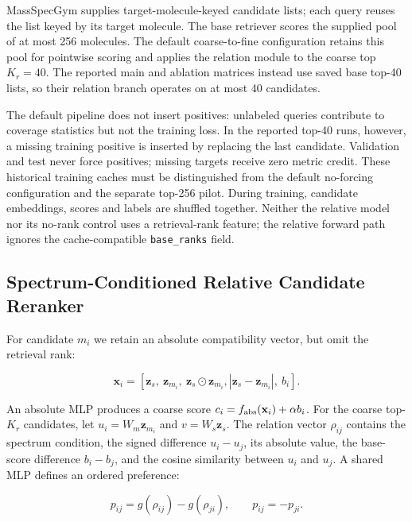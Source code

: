 \documentclass[runningheads]{llncs}
\newcommand{\zs}{\mathbf{z}_s}
\begin{document}
MassSpecGym supplies target-molecule-keyed candidate lists; each query reuses the
list keyed by its target molecule. The base retriever scores the supplied pool
of at most 256 molecules. The default coarse-to-fine configuration retains this
pool for pointwise scoring and applies the relation module to the coarse top
$K_r=40$. The reported main and ablation matrices instead use saved base top-40
lists, so their relation branch operates on at most 40 candidates.

The default pipeline does not insert positives: unlabeled queries contribute
to coverage statistics but not the training loss. In the reported top-40 runs,
however, a missing training positive is inserted by replacing the last
candidate. Validation and test never force positives; missing targets receive
zero metric credit. These historical training caches must be distinguished
from the default no-forcing configuration and the separate top-256 pilot.
During training, candidate embeddings, scores and labels are shuffled together.
Neither the relative model nor its no-rank control uses a retrieval-rank
feature; the relative forward path ignores the cache-compatible
\texttt{base\_ranks} field.

\subsection{Spectrum-Conditioned Relative Candidate Reranker}

For candidate $m_i$ we retain an absolute compatibility vector, but omit the
retrieval rank:

\begin{equation}
  \mathbf{x}_i=
  [\zs,\ \mathbf{z}_{m_i},\ \zs\odot\mathbf{z}_{m_i},
  |\zs-\mathbf{z}_{m_i}|,\ b_i].
  \label{eq:relative_features}
\end{equation}

An absolute MLP produces a coarse score $c_i=f_{\rm abs}(\mathbf{x}_i)+\alpha b_i$.
For the coarse top-$K_r$ candidates, let $u_i=W_m\mathbf{z}_{m_i}$ and
$v=W_s\zs$. The relation vector $\rho_{ij}$ contains the spectrum condition,
the signed difference $u_i-u_j$, its absolute value, the base-score difference
$b_i-b_j$, and the cosine similarity between $u_i$ and $u_j$. A shared MLP
defines an ordered preference:

\begin{equation}
  p_{ij}=g(\rho_{ij})-g(\rho_{ji}),
  \qquad p_{ij}=-p_{ji}.
  \label{eq:antisymmetry}
\end{equation}
\end{document}
